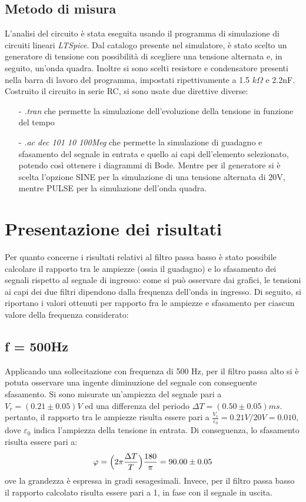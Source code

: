 \documentclass{article}
\begin{document}
\subsection{Metodo di misura}
L’analisi del circuito è stata eseguita usando il programma di simulazione di
circuiti lineari \emph{LTSpice}. Dal catalogo presente nel simulatore, è stato scelto un generatore di tensione con possibilità di scegliere una tensione alternata e, in
seguito, un’onda quadra. Inoltre si sono scelti resistore e condensatore presenti nella barra di lavoro del programma, impostati ripettivamente a 1.5 $k\Omega$ e 2.2nF. Costruito il circuito in serie RC, si sono usate due direttive diverse:
\begin{itemize}
    \item[-] \emph{.tran} che permette la simulazione dell’evoluzione della tensione in funzione del tempo
    \item[-] \emph{.ac dec 101 10 100Meg} che permette la simulazione di guadagno e sfasamento del segnale in entrata e quello ai capi dell’elemento selezionato, potendo così ottenere i diagrammi di Bode. Mentre per il generatore si è scelta l’opzione SINE per la simulazione di una tensione alternata di 20V, mentre PULSE per la simulazione dell’onda quadra.
\end{itemize}

\section{Presentazione dei risultati}
Per quanto concerne i risultati relativi al filtro passa basso è stato possibile
calcolare il rapporto tra le ampiezze (ossia il guadagno) e lo sfasamento dei
segnali rispetto al segnale di ingresso: come si può osservare dai grafici, le
tensioni ai capi dei due filtri dipendono dalla frequenza dell’onda in ingresso. Di
seguito, si riportano i valori ottenuti per rapporto fra le ampiezze e sfasamento
per ciascun valore della frequenza considerato:
\subsection{f = 500Hz}
Applicando una sollecitazione con frequenza di 500 Hz, per il filtro passa alto si
è potuta osservare una ingente diminuzione del segnale con conseguente sfasamento.
Si sono misurate un’ampiezza del segnale pari a $ V_r = (0.21 \pm 0.05) V$ ed una differenza del periodo $\Delta T = (0.50 \pm 0.05) ms$. pertanto, il rapporto tra le
ampiezze risulta essere pari a $\frac{V_r}{\varepsilon_0}
=0.21V/20V=0.010$, dove $\varepsilon_0$ indica l’ampiezza
della tensione in entrata. Di conseguenza, lo sfasamento risulta essere pari a:
\begin{equation}
    \varphi = \Bigl ( 2\pi \frac{\Delta T}{T} \Bigl) \frac{180}{\pi} = 90.00 \pm 0.05
\end{equation}
ove la grandezza è espressa in gradi sesagesimali. Invece, per il filtro passa basso
il rapporto calcolato risulta essere pari a 1, in fase con il segnale in uscita.
\end{document}
